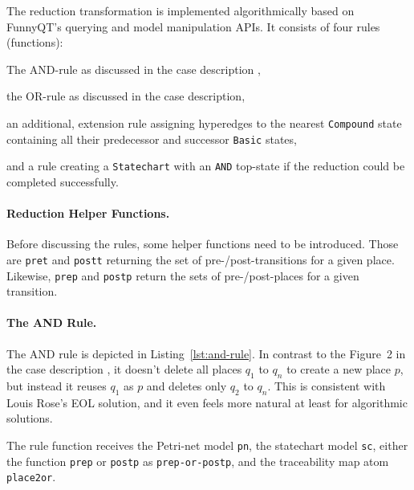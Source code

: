 \documentclass[submission]{eptcs}
\begin{document}
The reduction transformation is implemented algorithmically based on FunnyQT's
querying and model manipulation APIs.  It consists of four rules (functions):
\begin{compactenum}
\item The AND-rule as discussed in the case description \cite{pn2sccasedesc},
\item the OR-rule as discussed in the case description,
\item an additional, extension rule assigning hyperedges to the nearest
  \verb|Compound| state containing all their predecessor and successor
  \verb|Basic| states,
\item and a rule creating a \verb|Statechart| with an \verb|AND| top-state if
  the reduction could be completed successfully.
\end{compactenum}


\paragraph{Reduction Helper Functions.}
\label{sec:reduct-help-functions}

Before discussing the rules, some helper functions need to be introduced.
Those are \verb|pret| and \verb|postt| returning the set of
pre-/post-transitions for a given place.  Likewise, \verb|prep| and
\verb|postp| return the sets of pre-/post-places for a given transition.

\paragraph{The AND Rule.}
\label{sec:and-rule}

The AND rule is depicted in Listing~\ref{lst:and-rule}.  In contrast to the
Figure~2 in the case description \cite{pn2sccasedesc}, it doesn't delete all
places $q_1$ to $q_n$ to create a new place $p$, but instead it reuses $q_1$ as
$p$ and deletes only $q_2$ to $q_n$.  This is consistent with Louis Rose's EOL
solution, and it even feels more natural at least for algorithmic solutions.

The rule function receives the Petri-net model \verb|pn|, the statechart model
\verb|sc|, either the function \verb|prep| or \verb|postp| as
\verb|prep-or-postp|, and the traceability map atom \verb|place2or|.
\end{document}
